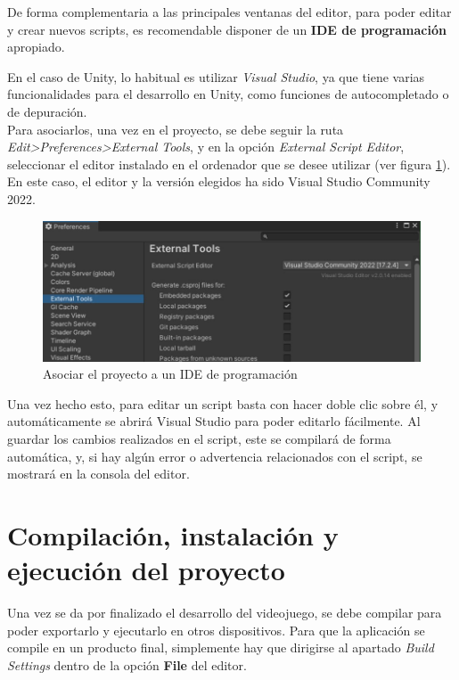 De forma complementaria a las principales ventanas del editor, para poder editar y crear nuevos scripts, es recomendable disponer de un \textbf{IDE de programación} apropiado.

En el caso de Unity, lo habitual es utilizar \textit{Visual Studio}, ya que tiene varias funcionalidades para el desarrollo en Unity, como funciones de autocompletado o de depuración.\\
Para asociarlos, una vez en el proyecto, se debe seguir la ruta \textit{Edit>Preferences>External Tools}, y en la opción \textit{External Script Editor}, seleccionar el editor instalado en el ordenador que se desee utilizar (ver figura \ref{fig:HerramientasExternas}). En este caso, el editor y la versión elegidos ha sido Visual Studio Community 2022.

\begin{figure}[h]
    \centering
    \includegraphics[scale=0.45]{img/ExternalTools.jpg}
    \caption{Asociar el proyecto a un IDE de programación}
    \label{fig:HerramientasExternas}
    \end{figure}
    
Una vez hecho esto, para editar un script basta con hacer doble clic sobre él, y automáticamente se abrirá Visual Studio para poder editarlo fácilmente. Al guardar los cambios realizados en el script, este se compilará de forma automática, y, si hay algún error o advertencia relacionados con el script, se mostrará en la consola del editor.

\section{Compilación, instalación y ejecución del proyecto}
Una vez se da por finalizado el desarrollo del videojuego, se debe compilar para poder exportarlo y ejecutarlo en otros dispositivos.
Para que la aplicación se compile en un producto final, simplemente hay que dirigirse al apartado \textit{Build Settings} dentro de la opción \textbf{File} del editor. 

